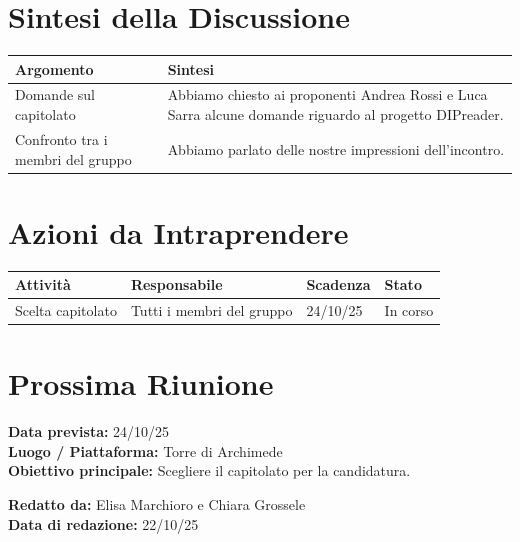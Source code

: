 \documentclass[a4paper,12pt]{article}
\begin{document}
\section*{ Sintesi della Discussione}

\begin{longtable}{|p{}|p{}|}
\hline
\textbf{Argomento} & \textbf{Sintesi} \\ \hline
Domande sul capitolato & Abbiamo chiesto ai proponenti Andrea Rossi e Luca Sarra alcune domande riguardo al progetto DIPreader. \\ \hline
Confronto tra i membri del gruppo & Abbiamo parlato delle nostre impressioni dell'incontro.  \\ \hline
\end{longtable}

\pagebreak
\section*{ Azioni da Intraprendere}

\begin{longtable}{|p{}|p{}|p{}|p{}|}
\hline
\textbf{Attività} & \textbf{Responsabile} & \textbf{Scadenza} & \textbf{Stato} \\ \hline
Scelta capitolato & Tutti i membri del gruppo & 24/10/25 & In corso \\ \hline
\end{longtable}


\section*{ Prossima Riunione}
\textbf{Data prevista:} 24/10/25 \\
\textbf{Luogo / Piattaforma:} Torre di Archimede \\
\textbf{Obiettivo principale:} Scegliere il capitolato per la candidatura.


\textbf{Redatto da:} Elisa Marchioro e Chiara Grossele \\
\textbf{Data di redazione:} 22/10/25
\end{document}
